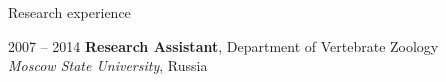 \documentclass[10pt]{article}
\begin{document}
\begin{cv}
\begin{cvlist}{Research experience}
 \item[2007 -- 2014] \textbf{Research Assistant}, Department of Vertebrate Zoology\\ \textit{Moscow State University}, Russia%
   


\end{cvlist}



\end{cv}
\end{document}
